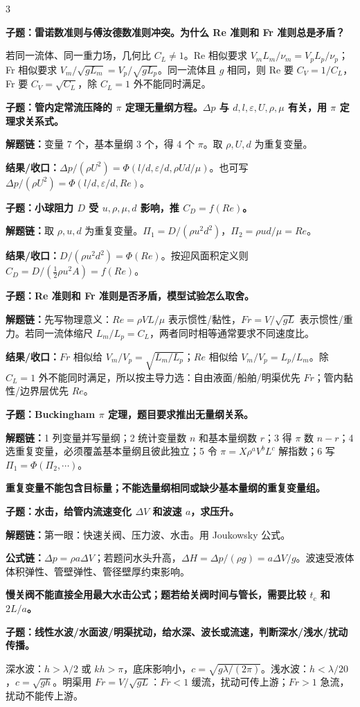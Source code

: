 \documentclass[a4paper]{article}
\newcommand{\qt}[1]{\vspace{0.10pt}\colorbox{Q}{\parbox{\dimexpr\linewidth-2\fboxsep}{\color{white}\bfseries #1}}\par}
\newcommand{\ans}[1]{\colorbox{G}{\parbox{\dimexpr\linewidth-2\fboxsep}{#1}}\par}
\newcommand{\warn}[1]{\colorbox{Y}{\parbox{\dimexpr\linewidth-2\fboxsep}{\color{E}\bfseries #1}}\par}
\newcommand{\chain}[1]{{\color{A}\bfseries 解题链：}#1\par}
\newcommand{\res}[1]{{\color{E}\bfseries 结果/收口：}#1\par}
\newcommand{\form}[1]{{\color{M}\bfseries 公式链：}#1\par}
\begin{document}
\begin{multicols}{3}
\qt{子题：雷诺数准则与傅汝德数准则冲突。为什么 Re 准则和 Fr 准则总是矛盾？}
\ans{若同一流体、同一重力场，几何比 $C_L\ne1$。Re 相似要求 $V_mL_m/\nu_m=V_pL_p/\nu_p$；Fr 相似要求 $V_m/\sqrt{gL_m}=V_p/\sqrt{gL_p}$。同一流体且 $g$ 相同，则 Re 要 $C_V=1/C_L$，Fr 要 $C_V=\sqrt{C_L}$，除 $C_L=1$ 外不能同时满足。}

\qt{子题：管内定常流压降的 $\pi$ 定理无量纲方程。$\Delta p$ 与 $d,l,\varepsilon,U,\rho,\mu$ 有关，用 $\pi$ 定理求关系式。}
\chain{变量 7 个，基本量纲 3 个，得 4 个 $\pi$。取 $\rho,U,d$ 为重复变量。}
\res{$\Delta p/(\rho U^2)=\Phi(l/d,\varepsilon/d,\rho Ud/\mu)$。也可写 $\Delta p/(\rho U^2)=\Phi(l/d,\varepsilon/d,Re)$。}

\qt{子题：小球阻力 $D$ 受 $u,\rho,\mu,d$ 影响，推 $C_D=f(Re)$。}
\chain{取 $\rho,u,d$ 为重复变量。$\Pi_1=D/(\rho u^2d^2)$，$\Pi_2=\rho ud/\mu=Re$。}
\res{$D/(\rho u^2d^2)=\Phi(Re)$。按迎风面积定义则 $C_D=D/(\frac12\rho u^2A)=f(Re)$。}

\qt{子题：Re 准则和 Fr 准则是否矛盾，模型试验怎么取舍。}
\chain{先写物理意义：$Re=\rho VL/\mu$ 表示惯性/黏性，$Fr=V/\sqrt{gL}$ 表示惯性/重力。若同一流体缩尺 $L_m/L_p=C_L$，两者同时相等通常要求不同速度比。}
\res{$Fr$ 相似给 $V_m/V_p=\sqrt{L_m/L_p}$；$Re$ 相似给 $V_m/V_p=L_p/L_m$。除 $C_L=1$ 外不能同时满足，所以按主导力选：自由液面/船舶/明渠优先 $Fr$；管内黏性/边界层优先 $Re$。}

\qt{子题：Buckingham $\pi$ 定理，题目要求推出无量纲关系。}
\chain{1 列变量并写量纲；2 统计变量数 $n$ 和基本量纲数 $r$；3 得 $\pi$ 数 $n-r$；4 选重复变量，必须覆盖基本量纲且彼此独立；5 令 $\pi=X\rho^aV^bL^c$ 解指数；6 写 $\Pi_1=\Phi(\Pi_2,\cdots)$。}
\warn{重复变量不能包含目标量；不能选量纲相同或缺少基本量纲的重复变量组。}

\qt{子题：水击，给管内流速变化 $\Delta V$ 和波速 $a$，求压升。}
\chain{第一眼：快速关阀、压力波、水击。用 Joukowsky 公式。}
\form{$\Delta p=\rho a\Delta V$；若题问水头升高，$\Delta H=\Delta p/(\rho g)=a\Delta V/g$。波速受液体体积弹性、管壁弹性、管径壁厚约束影响。}
\warn{慢关阀不能直接全用最大水击公式；题若给关阀时间与管长，需要比较 $t_c$ 和 $2L/a$。}

\qt{子题：线性水波/水面波/明渠扰动，给水深、波长或流速，判断深水/浅水/扰动传播。}
\ans{深水波：$h>\lambda/2$ 或 $kh>\pi$，底床影响小，$c=\sqrt{g\lambda/(2\pi)}$。浅水波：$h<\lambda/20$，$c=\sqrt{gh}$。明渠用 $Fr=V/\sqrt{gL}$：$Fr<1$ 缓流，扰动可传上游；$Fr>1$ 急流，扰动不能传上游。}



\end{multicols}
\end{document}
